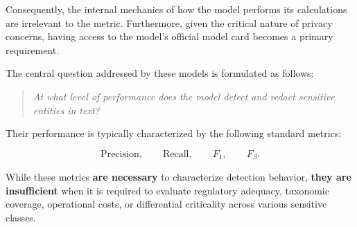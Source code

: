 \documentclass[11pt,a4paper]{article}
\begin{document}
Consequently, the internal mechanics of how the model performs its calculations are irrelevant to the metric. Furthermore, given the critical nature of privacy concerns, having access to the model's official model card becomes a primary requirement.

The central question addressed by these models is formulated as follows:

\begin{quote}
\textit{At what level of performance does the model detect and redact sensitive entities in text?}
\end{quote}

Their performance is typically characterized by the following standard metrics:

\begin{equation}
    \mathrm{Precision}, \qquad \mathrm{Recall}, \qquad F_1, \qquad F_{\beta}.
\end{equation}

While these metrics \textbf{are necessary} to characterize detection behavior, \textbf{they are insufficient} when it is required to evaluate regulatory adequacy, taxonomic coverage, operational costs, or differential criticality across various sensitive classes.






\end{document}
